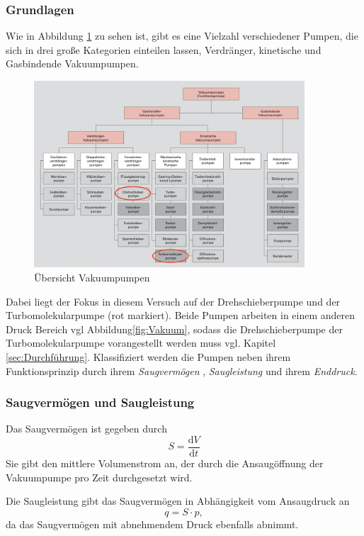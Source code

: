\subsubsection{Grundlagen}
Wie in Abbildung \ref{fig:pumpen} zu sehen ist, gibt es eine Vielzahl verschiedener Pumpen,
die sich in drei große Kategorien einteilen lassen,
Verdränger, kinetische und Gasbindende Vakuumpumpen.
\begin{figure}[h]
    \centering
    \includegraphics[width=0.9\textwidth]{abb/pumpen.png}
    \caption{Übersicht Vakuumpumpen\cite{Pfeifer}} 
    \label{fig:pumpen}
\end{figure} 
Dabei liegt der Fokus in diesem Versuch auf der Drehschieberpumpe und der Turbomolekularpumpe (rot markiert).
Beide Pumpen arbeiten in einem anderen Druck Bereich vgl Abbildung\eqref{fig:Vakuum}, 
sodass die Drehschieberpumpe der Turbomolekularpumpe vorangestellt werden muss vgl. Kapitel \ref{sec:Durchführung}.
Klassifiziert werden die Pumpen neben ihrem Funktionsprinzip durch ihrem \textit{Saugvermögen} ,
\textit{Saugleistung} und ihrem \textit{Enddruck}.

\subsubsection{Saugvermögen und Saugleistung}
Das Saugvermögen ist gegeben durch 
\begin{equation}
    S =\frac{\text{d}V}{\text{d}t}
\end{equation}
Sie gibt den mittlere Volumenstrom an,
der durch die Ansaugöffnung der Vakuumpumpe pro Zeit durchgesetzt wird.

Die Saugleistung gibt das Saugvermögen in Abhängigkeit vom Ansaugdruck an
\begin{equation}
    q = S\cdot p,
\end{equation}
da das Saugvermögen mit abnehmendem Druck ebenfalls abnimmt.

